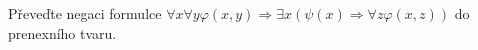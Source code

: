 \subsubsection{}
Převeďte negaci formulce $\forall x \forall y \varphi(x,y) \Rightarrow \exists x
(\psi(x) \Rightarrow \forall z \varphi(x,z))$ do prenexního tvaru.
